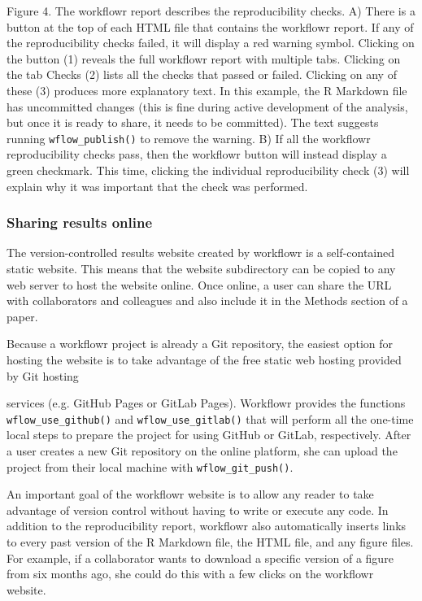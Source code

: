 \documentclass[9pt,a4paper]{extarticle}
\begin{document}
Figure 4. The workflowr report describes the reproducibility checks. A)
There is a button at the top of each HTML file that contains the
workflowr report. If any of the reproducibility checks failed, it will
display a red warning symbol. Clicking on the button (1) reveals the
full workflowr report with multiple tabs. Clicking on the tab Checks (2)
lists all the checks that passed or failed. Clicking on any of these (3)
produces more explanatory text. In this example, the R Markdown file has
uncommitted changes (this is fine during active development of the
analysis, but once it is ready to share, it needs to be committed). The
text suggests running \verb|wflow_publish()| to remove the warning. B) If all
the workflowr reproducibility checks pass, then the workflowr button
will instead display a green checkmark. This time, clicking the
individual reproducibility check (3) will explain why it was important
that the check was performed.

\subsubsection*{Sharing results online}

The version-controlled results website created by workflowr is a
self-contained static website. This means that the website subdirectory
can be copied to any web server to host the website online. Once online,
a user can share the URL with collaborators and colleagues and also
include it in the Methods section of a paper.

Because a workflowr project is already a Git repository, the easiest
option for hosting the website is to take advantage of the free static
web hosting provided by Git hosting

services (e.g. GitHub Pages or GitLab Pages). Workflowr provides the
functions \verb|wflow_use_github()| and \verb|wflow_use_gitlab()| that will perform
all the one-time local steps to prepare the project for using GitHub or
GitLab, respectively. After a user creates a new Git repository on the
online platform, she can upload the project from their local machine
with \verb|wflow_git_push()|.

An important goal of the workflowr website is to allow any reader to
take advantage of version control without having to write or execute any
code. In addition to the reproducibility report, workflowr also
automatically inserts links to every past version of the R Markdown
file, the HTML file, and any figure files. For example, if a
collaborator wants to download a specific version of a figure from six
months ago, she could do this with a few clicks on the workflowr
website.
\end{document}
